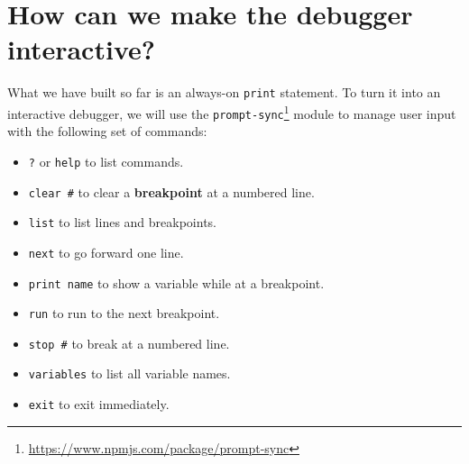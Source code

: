 \documentclass[krantzl]{krantz}
\newcommand{\glossref}[1]{\textbf{#1}}
\newcommand{\hreffoot}[2]{{#1}\footnote{\href{#2}{#2}}}
\begin{document}
\section{How can we make the debugger interactive?}\label{debugger-interactive}


What we have built so far is an always-on \texttt{print} statement.
To turn it into an interactive debugger,
we will use the \hreffoot{\texttt{prompt-sync}}{https://www.npmjs.com/package/prompt-sync} module to manage user input
with the following set of commands:

\begin{itemize}

\item 

\texttt{?} or \texttt{help} to list commands.



\item 

\texttt{clear \#} to clear a \glossref{breakpoint} at a numbered line.



\item 

\texttt{list} to list lines and breakpoints.



\item 

\texttt{next} to go forward one line.



\item 

\texttt{print name} to show a variable while at a breakpoint.



\item 

\texttt{run} to run to the next breakpoint.



\item 

\texttt{stop \#} to break at a numbered line.



\item 

\texttt{variables} to list all variable names.



\item 

\texttt{exit} to exit immediately.



\end{itemize}
\end{document}
